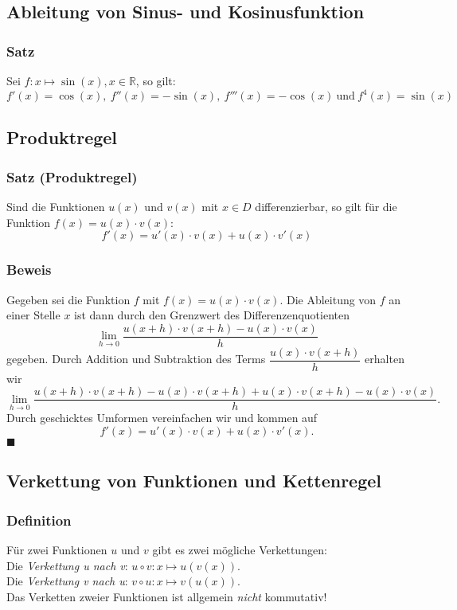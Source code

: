 \documentclass[a4paper,12pt]{article}
\newcommand{\R}{\mathbb{R}}
\newcommand{\qed}{\hfill $\blacksquare$}
\begin{document}
\subsection{Ableitung von Sinus- und Kosinusfunktion}
\subsubsection{Satz}
Sei $f:x\mapsto \sin (x), x\in\R$, so gilt:
\[ f'(x)=\cos(x), \ f''(x) = -\sin(x), \ f'''(x)=-\cos(x) \ \text{und} \ f^{4}(x)=\sin(x)\]

\subsection{Produktregel}
\subsubsection{Satz (Produktregel)}
Sind die Funktionen $u(x)$ und $v(x)$ mit $x\in D$ differenzierbar, so gilt für die Funktion $f(x)=u(x)\cdot v(x)$:
\[ f'(x)=u'(x)\cdot v(x) + u(x)\cdot v'(x) \]

\subsubsection{Beweis}
Gegeben sei die Funktion $f$ mit $f(x) = u(x) \cdot v(x)$. Die Ableitung von $f$ an einer Stelle $x$ ist dann durch den Grenzwert des Differenzenquotienten
\[ \lim \limits_{h \rightarrow 0} \dfrac{u(x+h)\cdot v(x+h)-u(x)\cdot v(x)}{h} \]
gegeben. Durch Addition und Subtraktion des Terms $\dfrac{u(x)\cdot v(x+h)}{h}$ erhalten wir
\[ \lim \limits_{h \rightarrow 0} \dfrac{u(x+h)\cdot v(x+h)- u(x)\cdot v(x+h) + u(x)\cdot v(x+h) - u(x)\cdot v(x)}{h} \text{.} \]
Durch geschicktes Umformen vereinfachen wir und kommen auf
\[ f'(x)=u'(x)\cdot v(x) + u(x) \cdot v'(x) \text{.}\]
\qed

\subsection{Verkettung von Funktionen und Kettenregel}
\subsubsection{Definition}
Für zwei Funktionen $u$ und $v$ gibt es zwei mögliche Verkettungen:\\
Die \emph{Verkettung u nach v}: $u \circ v:x \mapsto u(v(x))$.\\
Die \emph{Verkettung v nach u}: $v \circ u:x \mapsto v(u(x))$.\\
Das Verketten zweier Funktionen ist allgemein \emph{nicht} kommutativ! 
\end{document}
